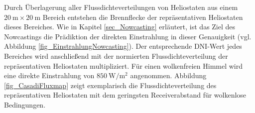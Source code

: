 Durch Überlagerung aller Flussdichteverteilungen von Heliostaten aus einem $\SI{20}{\metre} \times \SI{20}{\metre}$ Bereich entstehen die Brennflecke der repräsentativen Heliostaten dieses Bereiches.
Wie in Kapitel \ref{sec_Nowcasting} erläutert, ist das Ziel des Nowcastings die Prädiktion der direkten Einstrahlung in dieser Genauigkeit (vgl. Abbildung \ref{fig_EinstrahlungNowcasting}).
Der entsprechende DNI-Wert jedes Bereiches wird anschließend mit der normierten Flussdichteverteilung der repräsentativen Heliostaten multipliziert.
Für einen wolkenfreien Himmel wird eine direkte Einstrahlung von $\SI{850}{\watt\per\metre\squared}$ angenommen.
Abbildung \ref{fig_CasadiFluxmap} zeigt exemplarisch die Flussdichteverteilung des repräsentativen Heliostaten mit dem geringsten Receiverabstand für wolkenlose Bedingungen.

